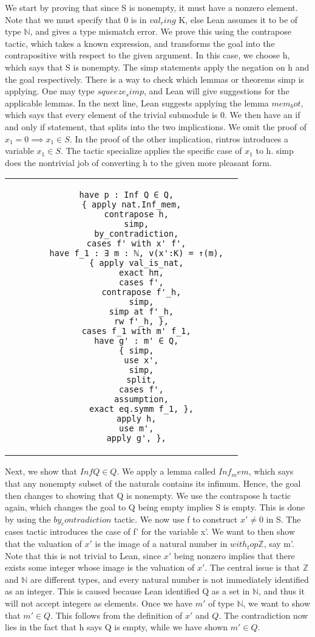 \documentclass[10pt, a4paper]{article}
\begin{document}
We start by proving that since S is nonempty, it must have a nonzero element. Note that we must specify that 0 is in $val_ring$ K, else Lean assumes it to be of type $\mathbb{N}$, and gives a type mismatch error. We prove this using the contrapose tactic, which takes a known expression, and transforms the goal into the contrapositive with respect to the given argument. In this case, we choose h, which says that S is nonempty. The simp statements apply the negation on h and the goal respectively. There is a way to check which lemmas or theorems simp is applying. One may type $squeeze_simp$, and Lean will give suggestions for the applicable lemmas. In the next line, Lean suggests applying the lemma $mem_bot$, which says that every element of the trivial submodule is 0. We then have an if and only if statement, that splits into the two implications. We omit the proof of $x_1 = 0 \implies x_1 \in S$. In the proof of the other implication, rintros introduces a variable $x_1 \in S$. The tactic specialize applies the specific case of $x_1$ to h. simp does the nontrivial job of converting h to the given more pleasant form. \\

\begin{tabular}{c|c}
    \begin{lstlisting}
    have p : Inf Q ∈ Q,
      { apply nat.Inf_mem,
        contrapose h,
        simp,
        by_contradiction,
        cases f' with x' f',
        have f_1 : ∃ m : ℕ, v(x':K) = ↑(m),
        { apply val_is_nat,
          exact hπ,
          cases f',
          contrapose f'_h,
          simp,
          simp at f'_h,
          rw f'_h, },
        cases f_1 with m' f_1,
        have g' : m' ∈ Q,
        { simp,
          use x',
          simp,
          split,
          cases f',
          assumption,
          exact eq.symm f_1, },
        apply h,
        use m',
        apply g', },
    \end{lstlisting} &   
\end{tabular}

Next, we show that $Inf Q \in Q$. We apply a lemma called $Inf_mem$, which says that any nonempty subset of the naturals contains its infimum. Hence, the goal then changes to showing that Q is nonempty. We use the contrapose h tactic again, which changes the goal to Q being empty implies S is empty. This is done by using the $by_contradiction$ tactic. We now use f to construct $x' \neq 0$ in S. The cases tactic introduces the case of f' for the variable x'. We want to then show that the valuation of $x'$ is the image of a natural number in $with_top \mathbb{Z}$, say m'. Note that this is not trivial to Lean, since $x'$ being nonzero implies that there exists some integer whose image is the valuation of $x'$. The central issue is that $\mathbb{Z}$ and $\mathbb{N}$ are different types, and every natural number is not immediately identified as an integer. This is caused because Lean identified Q as a set in $\mathbb{N}$, and thus it will not accept integers as elements. Once we have $m'$ of type $\mathbb{N}$, we want to show that $m' \in Q$. This follows from the definition of $x'$ and $Q$. The contradiction now lies in the fact that h says Q is empty, while we have shown $m' \in Q$. \\
\end{document}
